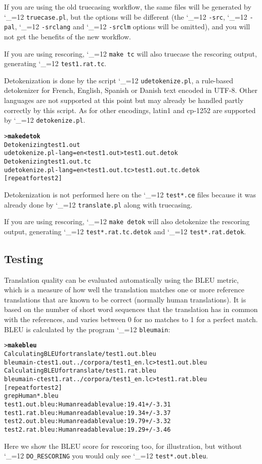 \documentclass[11pt,letterpaper]{article}
\def\code{\begingroup\catcode`\_=12 \codex}
\newcommand{\codex}[1]{\texttt{#1}\endgroup}
\begin{document}
If you are using the old truecasing workflow, the same files will be generated
by \code{truecase.pl}, but the options will be different (the \code{-src},
\code{-pal}, \code{-srclang} and \code{-srclm} options will be omitted), and you
will not get the benefits of the new workflow.

If you are using rescoring, \code{make tc} will also truecase the rescoring
output, generating \code{test1.rat.tc}.

Detokenization is done by the script \code{udetokenize.pl}, a rule-based
detokenizer for French, English, Spanish or Danish text encoded in UTF-8. Other
languages are not supported at this point but may already be handled partly
correctly by this script. As for other encodings, latin1 and cp-1252 are
supported by \code{detokenize.pl}.

\begin{small}
\begin{alltt}
   > \textbf{make detok}
   Detokenizing test1.out
   udetokenize.pl -lang=en < test1.out > test1.out.detok
   Detokenizing test1.out.tc
   udetokenize.pl -lang=en < test1.out.tc > test1.out.tc.detok
   [repeat for test2]
\end{alltt}
\end{small}

Detokenization is not performed here on the \code{test*.ce} files because
it was already done by \code{translate.pl} along with truecasing.

If you are using rescoring, \code{make detok} will also detokenize the
rescoring output, generating \code{test*.rat.tc.detok} and
\code{test*.rat.detok}.

\subsection{Testing} \label{Testing}

Translation quality can be evaluated automatically using the BLEU metric, which
is a measure of how well the translation matches one or more reference
translations that are known to be correct (normally human translations). It is
based on the number of short word sequences that the translation has in common
with the references, and varies between 0 for no matches to 1 for a perfect
match. BLEU is calculated by the program \code{bleumain}:
\begin{small}
\begin{alltt}
   > \textbf{make bleu}
   Calculating BLEU for translate/test1.out.bleu
   bleumain -c test1.out ../corpora/test1_en.lc > test1.out.bleu
   Calculating BLEU for translate/test1.rat.bleu
   bleumain -c test1.rat ../corpora/test1_en.lc > test1.rat.bleu
   [repeat for test2]
   grep Human *.bleu
   test1.out.bleu:Human readable value: 19.41 +/- 3.31
   test1.rat.bleu:Human readable value: 19.34 +/- 3.37
   test2.out.bleu:Human readable value: 19.79 +/- 3.32
   test2.rat.bleu:Human readable value: 19.29 +/- 3.46
\end{alltt}
\end{small}
Here we show the BLEU score for rescoring too, for illustration, but without
\code{DO_RESCORING} you would only see \code{test*.out.bleu}.
\end{document}
